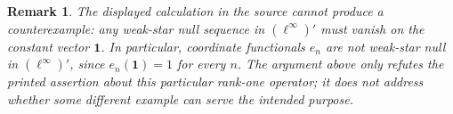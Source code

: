 \documentclass[11pt]{article}
\newtheorem{remark}{Remark}
\newcommand{\ellinf}{\ell^\infty}
\newcommand{\one}{\mathbf 1}
\begin{document}
\begin{remark}
The displayed calculation in the source cannot produce a counterexample:
any weak-star null sequence in \((\ellinf)'\) must vanish on the constant
vector \(\one\). In particular, coordinate functionals \(e_n\) are not
weak-star null in \((\ellinf)'\), since \(e_n(\one)=1\) for every \(n\).
The argument above only refutes the printed assertion about this particular
rank-one operator; it does not address whether some different example can
serve the intended purpose.
\end{remark}
\end{document}
